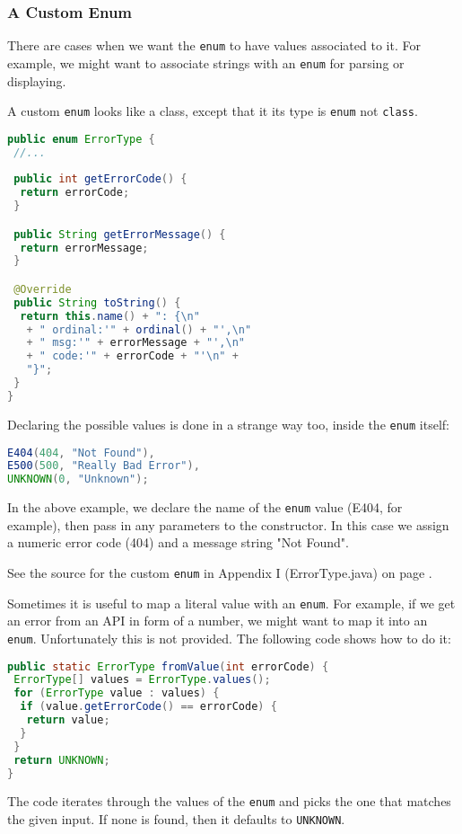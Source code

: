 \subsubsection{A Custom Enum}
There are cases when we want the \texttt{enum} to have values associated to it. For example, we might want to associate strings with an \texttt{enum} for parsing or displaying.

A custom \texttt{enum} looks like a class, except that it its type is \texttt{enum} not \texttt{class}.

\begin{lstlisting}[language=Java]
public enum ErrorType {
 //...
 
 public int getErrorCode() {
  return errorCode;
 }

 public String getErrorMessage() {
  return errorMessage;
 }

 @Override
 public String toString() {
  return this.name() + ": {\n"
   + " ordinal:'" + ordinal() + "',\n"
   + " msg:'" + errorMessage + "',\n"
   + " code:'" + errorCode + "'\n" +
   "}";
 }
}
\end{lstlisting}

Declaring the possible values is done in a strange way too, inside the \texttt{enum} itself:
\begin{lstlisting}[language=Java]
E404(404, "Not Found"),
E500(500, "Really Bad Error"),
UNKNOWN(0, "Unknown");
\end{lstlisting}
In the above example, we declare the name of the \texttt{enum} value (E404, for example), then pass in any parameters to the constructor. In this case we assign a numeric error code (404) and a message string "Not Found".

See the source for the custom \texttt{enum} in Appendix I (ErrorType.java) on page \pageref{App:AppendixIEnum}.

Sometimes it is useful to map a literal value with an \texttt{enum}. For example, if we get an error from an API in form of a number, we might want to map it into an \texttt{enum}. Unfortunately this is not provided. The following code shows how to do it:
\begin{lstlisting}[language=Java]
public static ErrorType fromValue(int errorCode) {
 ErrorType[] values = ErrorType.values();
 for (ErrorType value : values) {
  if (value.getErrorCode() == errorCode) {
   return value;
  }
 }
 return UNKNOWN;
}
\end{lstlisting}
The code iterates through the values of the \texttt{enum} and picks the one that matches the given input. If none is found, then it defaults to \texttt{UNKNOWN}.

